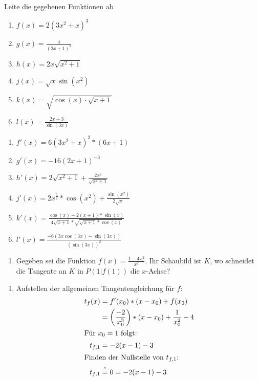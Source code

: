  Leite die gegebenen Funktionen ab
\begin{multicols}{3}
  \begin{enumerate}
    \item $f(x) = 2(3x^2+x)^3$
    \item $g(x) = \frac{4}{(2x+1)^2}$
    \item $h(x) = 2x\sqrt{x^2+1}$
    \item $j(x) = \sqrt{x}\sin(x^2)$
    \item $k(x) = \sqrt{\cos(x)\cdot\sqrt{x+1}}$
    \item $l(x) = \frac{2x+3}{\sin(3x)}$
  \end{enumerate}
\end{multicols}
\begin{lsg}{}
	\begin{enumerate}
    \item $f'(x) = 6(3x^2+x)^2*(6x+1)$
    \item $g'(x) = -16(2x+1)^{-3}$
    \item $h'(x) = 2\sqrt{x^2+1}+\frac{2x^2}{\sqrt{x^2+1}}$
    \item $j'(x) = 2x^{\frac 3 2}*\cos(x^2)+\frac{\sin(x^2)}{2\sqrt x}$
    \item $k'(x) = \frac{\cos(x)-2(x+1)*\sin(x)}{4\sqrt{x+1}*\sqrt{\sqrt{x+1}*\cos(x)}}$
    \item $l'(x) = \frac{-6\left(3x\cos(3x)-\sin(3x)\right)}{\left(\sin(3x)\right)^2}$
  \end{enumerate}
\end{lsg}



  \begin{enumerate}
    \item Gegeben sei die Funktion $f(x) = \frac{1-4x^2}{x^2}$. Ihr Schaubild ist $K$, wo schneidet die Tangente an $K$ in $P(1|f(1))$ die $x$-Achse?
  \end{enumerate}
	\begin{lsg}{}
		\begin{enumerate}
			\item Aufstellen der allgemeinen Tangentengleichung für $f$:
			\begin{align*}
				t_f(x)&=f'(x_0)*(x-x_0)+f(x_0)\\
							&=\left(\frac{-2}{x_0^3}\right)*(x-x_0)+\frac{1}{x_0^2}-4\\
				\intertext{Für $x_0=1$ folgt:}
				t_{f,1}&=-2(x-1)-3\\
				\intertext{Finden der Nullstelle von $t_{f,1}$:}
				t_{f,1}&\overset!=0=-2(x-1)-3\\
			\end{align*}
		\end{enumerate}
	\end{lsg}



